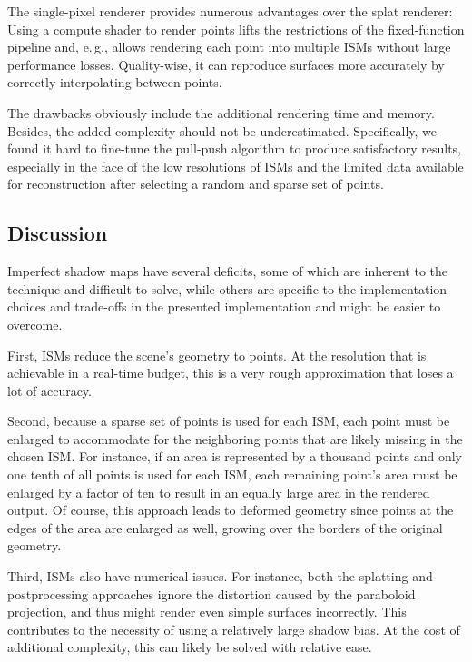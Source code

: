 The single-pixel renderer provides numerous advantages over the splat renderer: Using a compute shader to render points lifts the restrictions of the fixed-function pipeline and, e.\,g., allows rendering each point into multiple ISMs without large performance losses. Quality-wise, it can reproduce surfaces more accurately by correctly interpolating between points.

The drawbacks obviously include the additional rendering time and memory. Besides, the added complexity should not be underestimated. Specifically, we found it hard to fine-tune the pull-push algorithm to produce satisfactory results, especially in the face of the low resolutions of ISMs and the limited data available for reconstruction after selecting a random and sparse set of points.



\subsection{Discussion}
\label{sec:results:ism:discussion}

Imperfect shadow maps have several deficits, some of which are inherent to the technique and difficult to solve, while others are specific to the implementation choices and trade-offs in the presented implementation and might be easier to overcome.

First, ISMs reduce the scene's geometry to points. At the resolution that is achievable in a real-time budget, this is a very rough approximation that loses a lot of accuracy.

Second, because a sparse set of points is used for each ISM, each point must be enlarged to accommodate for the neighboring points that are likely missing in the chosen ISM. For instance, if an area is represented by a thousand points and only one tenth of all points is used for each ISM, each remaining point's area must be enlarged by a factor of ten to result in an equally large area in the rendered output. Of course, this approach leads to deformed geometry since points at the edges of the area are enlarged as well, growing over the borders of the original geometry.

Third, ISMs also have numerical issues. For instance, both the splatting and postprocessing approaches ignore the distortion caused by the paraboloid projection, and thus might render even simple surfaces incorrectly. This contributes to the necessity of using a relatively large shadow bias. At the cost of additional complexity, this can likely be solved with relative ease.

